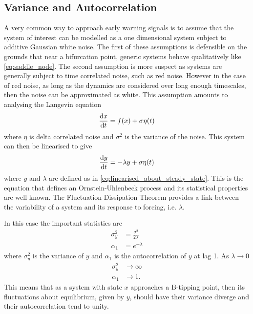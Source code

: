 \subsection{Variance and Autocorrelation}
A very common way to approach early warning signals is to assume that the system of interest can be modelled as a one dimensional system subject to additive Gaussian white noise. The first
of these assumptions is defensible on the grounds that near a bifurcation point, generic systems behave qualitatively like \cref{eq:saddle_node}. The second assumption is more suspect
as systems are generally subject to time correlated noise, such as red noise. However in the case of red noise, as long as the dynamics are considered over long enough timescales, then the
noise can be approximated as white. This assumption amounts to analysing the Langevin equation \parencite{Langevin1908}
\begin{equation}
  \label{eq:stochastic_system}
  \dv{x}{t} = f(x) + \sigma \eta(t) 
\end{equation}
where $\eta$ is delta correlated noise and $\sigma^2$ is the variance of the noise. This system can then be linearised to give
\begin{equation}
  \label{eq:ou_process}
  \dv{y}{t} = -\lambda y + \sigma \eta(t)
\end{equation}
where $y$ and $\lambda$ are defined as in \cref{eq:linearised_about_steady_state}. This is the equation that defines an Ornstein-Uhlenbeck process \parencite{Uhlenbeck1930} and its statistical
properties are well known. The Fluctuation-Dissipation Theorem \parencite{Marconi2008,Kubo1966,Leith1975,Einstein1905}
provides a link between the variability of a system and its response to
forcing, i.e. $\lambda$.

In this case the important statistics are
\begin{align}
  \sigma^2_y &= \frac{\sigma^2}{2\lambda} \label{eq:y_var}\\
  \alpha_1   &= e^{-\lambda} \label{eq:y_ac}
\end{align}
where $\sigma^2_y$ is the variance of $y$ and $\alpha_1$ is the autocorrelation of $y$ at lag 1. As $\lambda \rightarrow 0$
\begin{align}
  \sigma_y^2 &\rightarrow \infty \\
  \alpha_1    &\rightarrow 1.
\end{align}
This means that as a system with state $x$ approaches a B-tipping point, then its fluctuations about equilibrium, given by $y$, should have their variance diverge and their autocorrelation
tend to unity.

